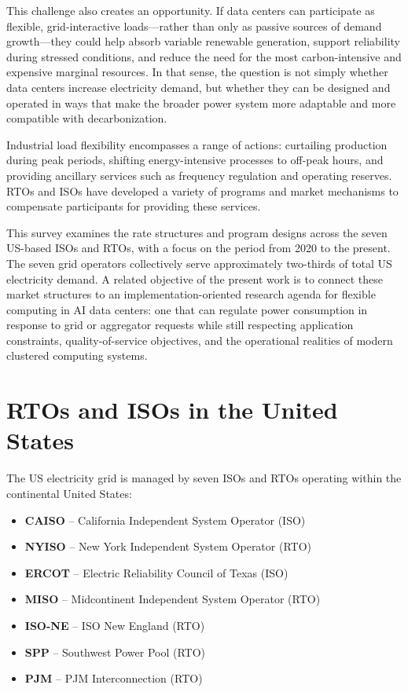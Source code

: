 \documentclass[12pt]{article}
\begin{document}
This challenge also creates an opportunity. If data centers can participate as flexible, grid-interactive loads---rather than only as passive sources of demand growth---they could help absorb variable renewable generation, support reliability during stressed conditions, and reduce the need for the most carbon-intensive and expensive marginal resources. In that sense, the question is not simply whether data centers increase electricity demand, but whether they can be designed and operated in ways that make the broader power system more adaptable and more compatible with decarbonization.

Industrial load flexibility encompasses a range of actions: curtailing production during peak periods, shifting energy-intensive processes to off-peak hours, and providing ancillary services such as frequency regulation and operating reserves. RTOs and ISOs have developed a variety of programs and market mechanisms to compensate participants for providing these services.

This survey examines the rate structures and program designs across the seven US-based ISOs and RTOs, with a focus on the period from 2020 to the present. The seven grid operators collectively serve approximately two-thirds of total US electricity demand. A related objective of the present work is to connect these market structures to an implementation-oriented research agenda for flexible computing in AI data centers: one that can regulate power consumption in response to grid or aggregator requests while still respecting application constraints, quality-of-service objectives, and the operational realities of modern clustered computing systems.

\section{RTOs and ISOs in the United States}
The US electricity grid is managed by seven ISOs and RTOs operating within the continental United States:
\begin{itemize}
    \item \textbf{CAISO} -- California Independent System Operator (ISO)
    \item \textbf{NYISO} -- New York Independent System Operator (RTO)
    \item \textbf{ERCOT} -- Electric Reliability Council of Texas (ISO)
    \item \textbf{MISO} -- Midcontinent Independent System Operator (RTO)
    \item \textbf{ISO-NE} -- ISO New England (RTO)
    \item \textbf{SPP} -- Southwest Power Pool (RTO)
    \item \textbf{PJM} -- PJM Interconnection (RTO)
\end{itemize}
\end{document}
